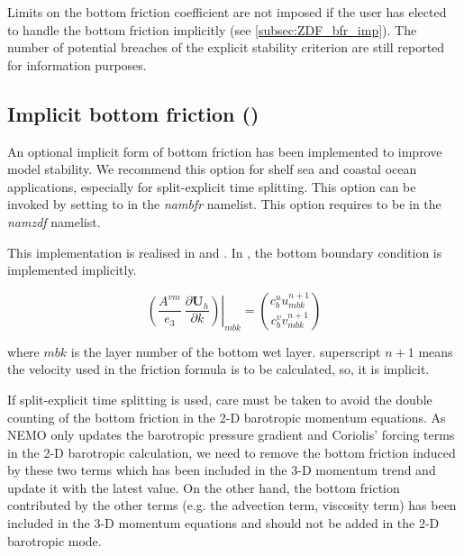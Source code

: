 \documentclass[../tex_main/NEMO_manual]{subfiles}
\begin{document}
Limits on the bottom friction coefficient are not imposed if the user has elected to
handle the bottom friction implicitly (see \autoref{subsec:ZDF_bfr_imp}). The number of potential
breaches of the explicit stability criterion are still reported for information purposes.

\subsection{Implicit bottom friction (\protect{})}
\label{subsec:ZDF_bfr_imp}

An optional implicit form of bottom friction has been implemented to improve
model stability. We recommend this option for shelf sea and coastal ocean applications, especially 
for split-explicit time splitting. This option can be invoked by setting  
to  in the \textit{nambfr} namelist. This option requires  to be  
in the \textit{namzdf} namelist. 

This implementation is realised in  and . In , the 
bottom boundary condition is implemented implicitly.

\begin{equation} \label{eq:dynzdf_bfr}
\left.{\left( {\frac{A^{vm} }{e_3 }\ \frac{\partial \textbf{U}_h}{\partial k}} \right)} \right|_{mbk}
	 = \binom{c_{b}^{u}u^{n+1}_{mbk}}{c_{b}^{v}v^{n+1}_{mbk}}
\end{equation}

where $mbk$ is the layer number of the bottom wet layer. superscript $n+1$ means the velocity used in the
friction formula is to be calculated, so, it is implicit.

If split-explicit time splitting is used, care must be taken to avoid the double counting of
the bottom friction in the 2-D barotropic momentum equations. As NEMO only updates the barotropic 
pressure gradient and Coriolis' forcing terms in the 2-D barotropic calculation, we need to remove
the bottom friction induced by these two terms which has been included in the 3-D momentum trend 
and update it with the latest value. On the other hand, the bottom friction contributed by the
other terms (e.g. the advection term, viscosity term) has been included in the 3-D momentum equations
and should not be added in the 2-D barotropic mode.
\end{document}
